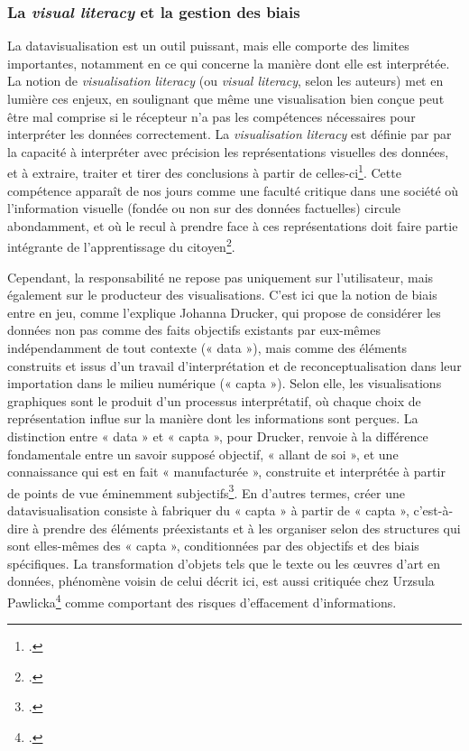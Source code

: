 \subsubsection{La \textit{visual literacy} et la gestion des biais}

La datavisualisation est un outil puissant, mais elle comporte des limites importantes, notamment en ce qui concerne la manière dont elle est interprétée. La notion de \textit{visualisation literacy} (ou \textit{visual literacy}, selon les auteurs) met en lumière ces enjeux, en soulignant que même une visualisation bien conçue peut être mal comprise si le récepteur n’a pas les compétences nécessaires pour interpréter les données correctement. 
La \textit{visualisation literacy} est définie par \citeauthor{shao_data_2024} par la capacité à interpréter avec précision les représentations visuelles des données, et à extraire, traiter et tirer des conclusions à partir de celles-ci\footcite{shao_data_2024}. Cette compétence apparaît de nos jours comme une faculté critique dans une société où l’information visuelle (fondée ou non sur des données factuelles) circule abondamment, et où le recul à prendre face à ces représentations doit faire partie intégrante de l’apprentissage du citoyen\footcite[p.454]{graham_introduction_2017}.

Cependant, la responsabilité ne repose pas uniquement sur l’utilisateur, mais également sur le producteur des visualisations. C’est ici que la notion de biais entre en jeu, comme l’explique Johanna Drucker, qui propose de considérer les données non pas comme des faits objectifs existants par eux-mêmes indépendamment de tout contexte (« data »), mais comme des éléments construits et issus d’un travail d’interprétation et de reconceptualisation dans leur importation dans le milieu numérique (« capta »). Selon elle, les visualisations graphiques sont le produit d’un processus interprétatif, où chaque choix de représentation influe sur la manière dont les informations sont perçues. La distinction entre « data » et « capta », pour Drucker, renvoie à la différence fondamentale entre un savoir supposé objectif, « allant de soi », et une connaissance qui est en fait « manufacturée », construite et interprétée à partir de points de vue éminemment subjectifs\footcite[p.5]{drucker_humanities_2010}. En d’autres termes, créer une datavisualisation consiste à fabriquer du « capta » à partir de « capta », c’est-à-dire à prendre des éléments préexistants et à les organiser selon des structures qui sont elles-mêmes des « capta », conditionnées par des objectifs et des biais spécifiques. La transformation d’objets tels que le texte ou les œuvres d’art en données, phénomène voisin de celui décrit ici, est aussi critiquée chez Urzsula Pawlicka\footcite[p.531]{pawlicka_data_2017} comme comportant des risques d’effacement d’informations.
\newline
{}\\

